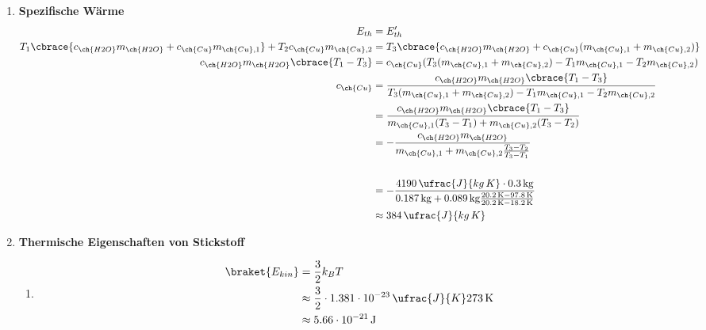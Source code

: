 \documentclass[11pt,letterpaper]{article}
\begin{document}
\begin{enumerate}
  \item \textbf{Spezifische Wärme}
    \begin{align*}
      E_{th} &= E'_{th}\\
      T_1 \cbrace{c_{\ch{H2O}}m_{\ch{H2O}} + c_{\ch{Cu}} m_{\ch{Cu},1}} + T_2 c_{\ch{Cu}} m_{\ch{Cu},2}&= 
      T_3 \cbrace{c_{\ch{H2O}}m_{\ch{H2O}} + c_{\ch{Cu}} (m_{\ch{Cu},1} + m_{\ch{Cu},2})}\\
      c_{\ch{H2O}}m_{\ch{H2O}} \cbrace{T_1 - T_3}&= 
      c_{\ch{Cu}} (T_3 (m_{\ch{Cu},1} + m_{\ch{Cu},2})- T_1 m_{\ch{Cu},1} - T_2 m_{\ch{Cu},2} )\\
      c_{\ch{Cu}}  &= \frac{c_{\ch{H2O}}m_{\ch{H2O}} \cbrace{T_1 - T_3}}{ T_3 (m_{\ch{Cu},1} + m_{\ch{Cu},2}) - T_1 m_{\ch{Cu},1} - T_2 m_{\ch{Cu},2} }\\
      &= \frac{c_{\ch{H2O}}m_{\ch{H2O}} \cbrace{T_1 - T_3}}
      {  m_{\ch{Cu},1}(T_3-T_1) + m_{\ch{Cu},2}(T_3-T_2) }\\
      &= -\frac{c_{\ch{H2O}}m_{\ch{H2O}} }
      {  m_{\ch{Cu},1} + m_{\ch{Cu},2}\frac{T_3-T_2}{T_3-T_1} }\\
      \\
      &= - \frac{4190 \,\ufrac{J}{kg\,K}\cdot 0.3\,\mathrm{kg}}{0.187\,\mathrm{kg} 
      + 0.089\,\mathrm{kg} \frac{20.2\,\mathrm{K}-97.8\,\mathrm{K}}{20.2\,\mathrm{K}-18.2\,\mathrm{K}}}\\
      &\approx 384\,\ufrac{J}{kg\,K}
    \end{align*}


  \item \textbf{Thermische Eigenschaften von Stickstoff}
    \begin{enumerate}
      \item
        \begin{align*}
          \braket{E_{kin}}&= \frac{3}{2}k_B T\\
          &\approx \frac{3}{2} \cdot 1.381\cdot 10^{-23}\,\ufrac{J}{K} 273\,\mathrm{K}\\
          &\approx 5.66  \cdot 10^{-21}\,\mathrm{J}
        \end{align*}


\end{enumerate}
\end{enumerate}
\end{document}
